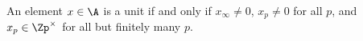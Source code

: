 An element $x\in\A$ is a unit if and only if $x_\infty\ne0$, $x_p\ne0$ for all $p$, and $x_p\in\Zp^\times$ for all but finitely many $p$.
